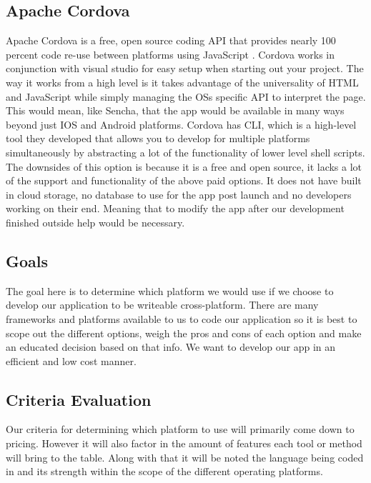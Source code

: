 \documentclass[letterpaper,10pt,draftclsnofoot,onecolumn,titlepage]{IEEEtran}
\begin{document}
	\subsection{Apache Cordova}
		Apache Cordova is a free, open source coding API that provides nearly 100 percent code re-use between platforms using JavaScript \cite{Cordova}. Cordova works in conjunction with visual studio for easy setup when starting out your project. The way it works from a high level is it takes advantage of the universality of HTML and JavaScript while simply managing the OSs specific API to interpret the page. This would mean, like Sencha, that the app would be available in many ways beyond just IOS and Android platforms. Cordova has CLI, which is a high-level tool they developed that allows you to develop for multiple platforms simultaneously by abstracting a lot of the functionality of lower level shell scripts. The downsides of this option is because it is a free and open source, it lacks a lot of the support and functionality of the above paid options. It does not have built in cloud storage, no database to use for the app post launch and no developers working on their end. Meaning that to modify the app after our development finished outside help would be necessary.
	\subsection{Goals}
		The goal here is to determine which platform we would use if we choose to develop our application to be writeable cross-platform. There are many frameworks and platforms available to us to code our application so it is best to scope out the different options, weigh the pros and cons of each option and make an educated decision based on that info. We want to develop our app in an efficient and low cost manner.
	\subsection{Criteria Evaluation}
		Our criteria for determining which platform to use will primarily come down to pricing. However it will also factor in the amount of features each tool or method will bring to the table. Along with that it will be noted the language being coded in and its strength within the scope of the different operating platforms.
\end{document}
